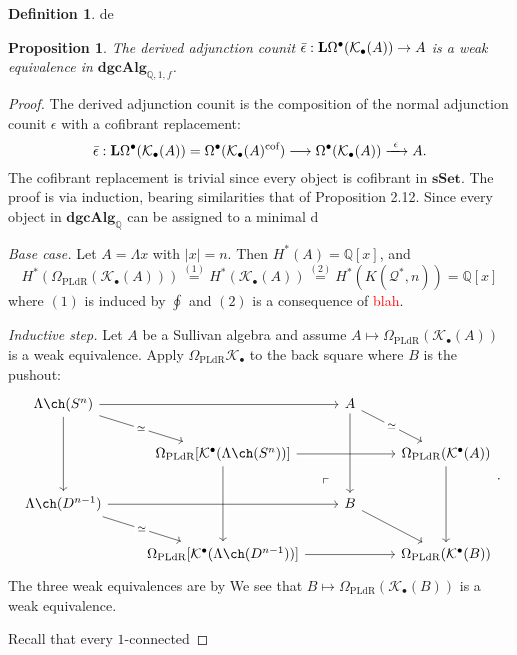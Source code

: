 \documentclass[psamsfonts]{amsart}
\newtheorem{prop}{Proposition}[section]
\theoremstyle{definition}
\newtheorem{defn}{Definition}[section]
\newcommand{\Q}{\mathbb{Q}}
\newcommand{\sSet}{\mathbf{sSet}}
\newcommand{\dgcAlg}{\mathbf{dgcAlg}}
\numberwithin{equation}{section}
\begin{document}
\begin{defn}
de
\end{defn}

\begin{prop}
The derived adjunction counit $\Bar{\epsilon}:\mathbf{L}\Omega^\bullet(\mathcal{K}_\bullet(A))\to A$ is a weak equivalence in $\dgcAlg_{\Q,1,f}$.  
\end{prop}
\begin{proof}

The derived adjunction counit is the composition of the normal adjunction counit $\epsilon$ with a cofibrant replacement:
\[\Bar{\epsilon}:\mathbf{L}\Omega^\bullet(\mathcal{K}_\bullet(A))=\Omega^\bullet(\mathcal{K}_\bullet(A)^\textrm{cof})\longrightarrow\Omega^\bullet(\mathcal{K}_\bullet(A))\xrightarrow{\ \epsilon\ }A.\]
The cofibrant replacement is trivial since every object is cofibrant in $\sSet$. The proof is via induction, bearing similarities that of Proposition 2.12. Since every object in $\dgcAlg_\Q$ can be assigned to a minimal d\medbreak

\textit{Base case.} Let $A=\Lambda x$ with $|x|=n$. Then $H^\ast(A)=\Q[x]$, and
\[H^\ast(\Omega_\textrm{PLdR}(\mathcal{K}_\bullet(A)))\stackrel{(1)}{=}H^\ast(\mathcal{K}_\bullet(A))\stackrel{(2)}{=}H^\ast(K(\mathcal{Q}^\ast,n))=\Q[x]\]
where $(1)$ is induced by $\oint$ and $(2)$ is a consequence of \textcolor{red}{blah}.\medbreak

\textit{Inductive step.} Let $A$ be a Sullivan algebra and assume $A\mapsto\Omega_\textrm{PLdR}(\mathcal{K}_\bullet(A))$ is a weak equivalence.
Apply $\Omega_\textrm{PLdR}\mathcal{K}_\bullet$ to the back square where $B$ is the pushout:
\[\begin{tikzcd}
	{\Lambda\ch(S^n)} && A\arrow[dd,phantom,"\ulcorner",very near end, shift right=4ex] \\
	& {\Omega_\textrm{PLdR}[\mathcal{K}^\bullet(\Lambda\ch(S^n))]} && {\Omega_\textrm{PLdR}(\mathcal{K}^\bullet(A))} \\
	{\Lambda\ch(D^{n-1})} && B \\
	& {\Omega_\textrm{PLdR}[\mathcal{K}^\bullet(\Lambda\ch(D^{n-1}))]} && {\Omega_\textrm{PLdR}(\mathcal{K}^\bullet(B))}
	\arrow["\simeq"{description}, from=1-1, to=2-2]
	\arrow[from=1-1, to=1-3]
	\arrow[from=2-2,crossing over, to=2-4]
	\arrow["\simeq"{description}, from=1-3, to=2-4]
	\arrow[from=1-1, to=3-1]
	\arrow[from=2-2,crossing over, to=4-2]
	\arrow["\simeq"{description}, from=3-1, to=4-2]
	\arrow[from=2-4, to=4-4]
	\arrow[from=3-1, to=3-3]
	\arrow[from=1-3, to=3-3]
	\arrow[from=3-3, to=4-4]
	\arrow[from=4-2, to=4-4]
\end{tikzcd}.\]
The three weak equivalences are by 
We see that $B\mapsto\Omega_\textrm{PLdR}(\mathcal{K}_\bullet(B))$ is a weak equivalence.

Recall that every $1$-connected
\end{proof}
\end{document}
